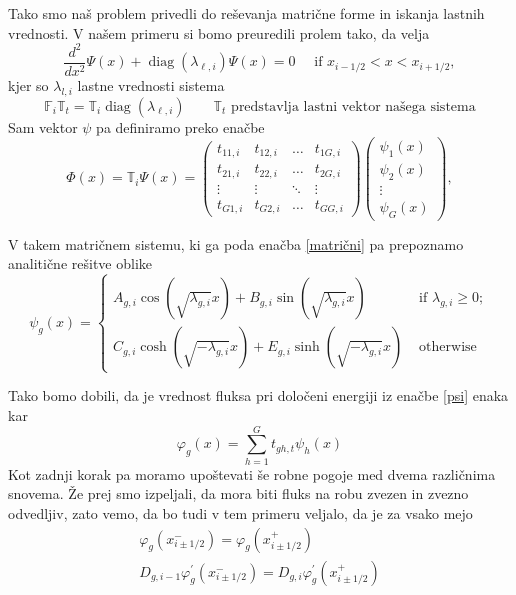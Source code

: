 \documentclass[slovene,11pt,a4paper]{article}
\def\phi{\varphi}
\begin{document}
Tako smo naš problem privedli do reševanja matrične forme in iskanja lastnih vrednosti. V našem primeru si bomo preuredili prolem tako, da velja 
\begin{equation}
\frac{d^{2}}{d x^{2}} \Psi(x)+\operatorname{diag}\left(\lambda_{\ell, i}\right) \Psi(x)=0 \quad \text { if } x_{i-1 / 2}<x<x_{i+1 / 2},
\label{matrični}
\end{equation}
kjer so $\lambda_{l,i}$ lastne vrednosti sistema
\begin{equation}
\mathbb{F}_{i} \mathbb{T}_{t}=\mathbb{T}_{i} \operatorname{diag}\left(\lambda_{\ell, i}\right) \qquad \mathbb{T}_{t} \text{ predstavlja lastni vektor našega sistema}
\end{equation}
Sam vektor $\psi$ pa definiramo preko enačbe \begin{equation}
\Phi(x)=\mathbb{T}_{i} \Psi(x)=\left(\begin{array}{cccc}
t_{11, i} & t_{12, i} & \ldots & t_{1 G, i} \\
t_{21, i} & t_{22, i} & \ldots & t_{2 G, i} \\
\vdots & \vdots & \ddots & \vdots \\
t_{G 1, i} & t_{G 2, i} & \ldots & t_{G G, i}
\end{array}\right)\left(\begin{array}{c}
\psi_{1}(x) \\
\psi_{2}(x) \\
\vdots \\
\psi_{G}(x)
\end{array}\right),
\label{psi}
\end{equation}

V takem matričnem sistemu, ki ga poda enačba \eqref{matrični} pa prepoznamo analitične rešitve oblike
\begin{equation}
\psi_{g}(x)= \begin{cases}A_{g, i} \cos \left(\sqrt{\lambda_{g, i}} x\right)+B_{g, i} \sin \left(\sqrt{\lambda_{g, i}} x\right) & \text { if } \lambda_{g, i} \geq 0 ; \\ C_{g, i} \cosh \left(\sqrt{-\lambda_{g, i}} x\right)+E_{g, i} \sinh \left(\sqrt{-\lambda_{g, i}} x\right) & \text { otherwise }\end{cases}
\end{equation}

Tako bomo dobili, da je vrednost fluksa pri določeni energiji iz enačbe \eqref{psi}
enaka kar 
\begin{equation}
    \phi_g(x)=\sum_{h=1}^G t_{gh,t}\psi_h(x)
\end{equation}
Kot zadnji korak pa moramo upoštevati še robne pogoje med dvema različnima snovema. Že prej smo izpeljali, da mora biti fluks na robu zvezen in zvezno odvedljiv, zato vemo, da bo tudi v tem primeru veljalo, da je za vsako mejo 
\begin{equation}
\begin{gathered}
\phi_{g}\left(x_{i\pm1 / 2}^{-}\right)=\phi_{g}\left(x_{i\pm1 / 2}^{+}\right) \\
D_{g, i-1} \phi_{g}^{\prime}\left(x_{i\pm1 / 2}^{-}\right)=D_{g, i} \phi_{g}^{\prime}\left(x_{i\pm1 / 2}^{+}\right)
\end{gathered}
\end{equation}
\end{document}
